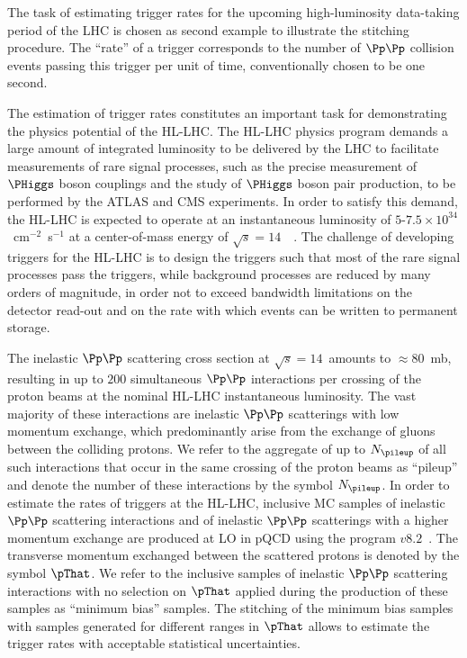 The task of estimating trigger rates for the upcoming high-luminosity data-taking period of the LHC is chosen as second example to illustrate the stitching procedure.
The ``rate'' of a trigger corresponds to the number of $\Pp\Pp$ collision events passing this trigger per unit of time, conventionally chosen to be one second.

The estimation of trigger rates constitutes an important task for demonstrating the physics potential of the HL-LHC.
The HL-LHC physics program demands a large amount of integrated luminosity to be delivered by the LHC 
to facilitate measurements of rare signal processes,
such as the precise measurement of $\PHiggs$ boson couplings and the study of $\PHiggs$ boson pair production, to be performed by the ATLAS and CMS experiments.
In order to satisfy this demand, the HL-LHC is expected to operate at an instantaneous luminosity of $5$-$7.5 \times 10^{34}$~cm$^{-2}$~s$^{-1}$
at a center-of-mass energy of $\sqrt{s} = 14$~\TeV~\cite{TDR_Phase2_lhc}.
The challenge of developing triggers for the HL-LHC is to design the triggers such that most of the rare signal processes pass the triggers,
while background processes are reduced by many orders of magnitude, in order not to exceed bandwidth limitations on the detector read-out 
and on the rate with which events can be written to permanent storage.

The inelastic $\Pp\Pp$ scattering cross section at $\sqrt{s} = 14$~\TeV amounts to $\approx 80$~mb,
resulting in up to $200$ simultaneous $\Pp\Pp$ interactions per crossing of the proton beams at the nominal HL-LHC instantaneous luminosity.
The vast majority of these interactions are inelastic $\Pp\Pp$ scatterings with low momentum exchange,
which predominantly arise from the exchange of gluons between the colliding protons.
We refer to the aggregate of up to $N_{\pileup}$ of all such interactions that occur in the same crossing of the proton beams as ``pileup''
and denote the number of these interactions by the symbol $N_{\pileup}$.
In order to estimate the rates of triggers at the HL-LHC,
inclusive MC samples of inelastic $\Pp\Pp$ scattering interactions 
and of inelastic $\Pp\Pp$ scatterings with a higher momentum exchange are produced at LO in pQCD
using the program \PYTHIA $v8.2$~\cite{Sjostrand:2014zea}.
The transverse momentum exchanged between the scattered protons is denoted by the symbol $\pThat$.
We refer to the inclusive samples of inelastic $\Pp\Pp$ scattering interactions with no selection on $\pThat$ applied during the production of these samples
as ``minimum bias'' samples.
The stitching of the minimum bias samples with samples generated for different ranges in $\pThat$ allows to estimate the trigger rates with acceptable statistical uncertainties.

